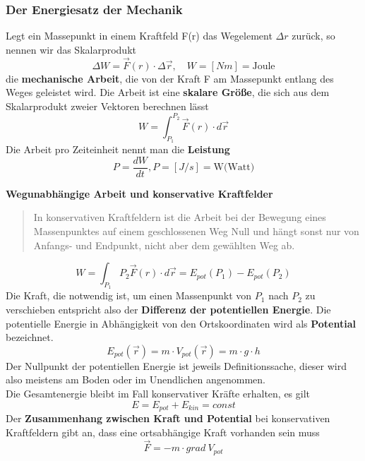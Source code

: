 \documentclass[12pt,a4paper,ngerman]{article}
\begin{document}
\pagebreak

\subsubsection*{Der Energiesatz der Mechanik}
Legt ein Massepunkt in einem Kraftfeld F(r) das Wegelement $\Delta r$ zurück, so nennen wir das Skalarprodukt
\begin{equation}
\Delta W = \vec{F}(r) \cdot \Delta \vec{r}, \quad W = [Nm] = \text{Joule}
\end{equation}
die \textbf{mechanische Arbeit}, die von der Kraft F am Massepunkt entlang des Weges geleistet wird. Die Arbeit ist eine \textbf{skalare Größe}, die sich aus dem Skalarprodukt zweier Vektoren berechnen lässt
\begin{equation}
W = \int_{P_1}^{P_2}{\vec{F}(r) \cdot d\vec{r}}
\end{equation}
Die Arbeit pro Zeiteinheit nennt man die \textbf{Leistung}
\begin{equation}
P = \frac{dW}{dt}, P = [J/s] = \text{W(Watt)}
\end{equation}

\vspace{0.5cm}
\textbf{Wegunabhängige Arbeit und konservative Kraftfelder}\\
\begin{verse}
In konservativen Kraftfeldern ist die Arbeit bei der Bewegung eines Massenpunktes auf einem geschlossenen Weg Null und hängt sonst nur von Anfangs- und Endpunkt, nicht aber dem gewählten Weg ab. 
\end{verse}

\begin{equation}
W = \int_{P_1}{P_2}{\vec{F}(r) \cdot d\vec{r}} = E_{pot}(P_1) - E_{pot}(P_2)
\end{equation}
Die Kraft, die notwendig ist, um einen Massenpunkt von $P_1$ nach $P_2$ zu verschieben entspricht also der \textbf{Differenz der potentiellen Energie}. Die potentielle Energie in Abhängigkeit von den Ortskoordinaten wird als \textbf{Potential} bezeichnet.
\begin{equation}
E_{pot}(\vec{r})= m \cdot V_{pot}(\vec{r}) = m \cdot g \cdot h
\end{equation}
Der Nullpunkt der potentiellen Energie ist jeweils Definitionssache, dieser wird also meistens am Boden oder im Unendlichen angenommen. \\
Die Gesamtenergie bleibt im Fall konservativer Kräfte erhalten, es gilt 
\begin{equation}
E = E_{pot} + E_{kin} = const
\end{equation}
Der \textbf{Zusammenhang zwischen Kraft und Potential} bei konservativen Kraftfeldern gibt an, dass eine ortsabhängige Kraft vorhanden sein muss
\begin{equation}
\vec{F}  = -m \cdot grad \ V_{pot}
\end{equation}
\end{document}
